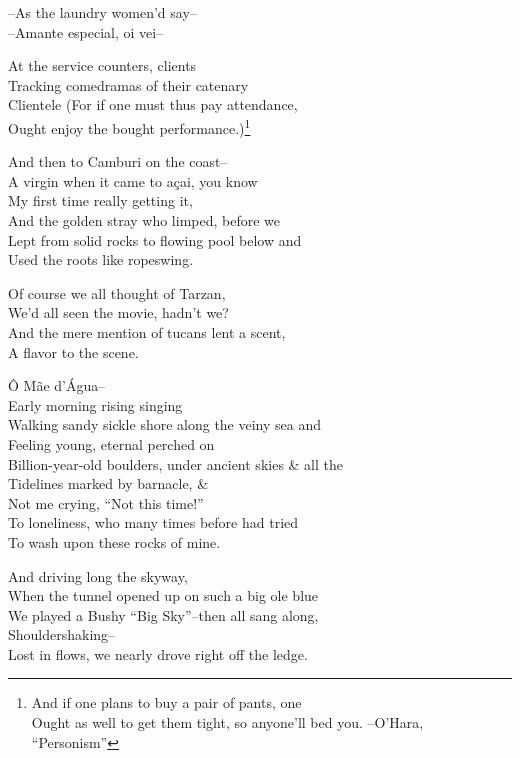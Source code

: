 --As the laundry women'd say-- \\
--Amante especial, oi vei-- 

At the service counters, clients \\
Tracking comedramas of their catenary \\
Clientele (For if one must thus pay attendance, \\ 
Ought enjoy the bought performance.)\footnote{And if one plans to buy a pair of pants, one \\
Ought as well to get them tight, so anyone'll bed you. --O'Hara, ``Personism''}

And then to Camburi on the coast-- \\
A virgin when it came to açai, you know \\
My first time really getting it, \\
And the golden stray who limped, before we \\
Lept from solid rocks to flowing pool below and \\
Used the roots like ropeswing.

Of course we all thought of Tarzan, \\
We'd all seen the movie, hadn't we? \\
And the mere mention of tucans lent a scent, \\
A flavor to the scene.

Ô Mãe d'Água-- \\
Early morning rising singing \\
Walking sandy sickle shore along the veiny sea and \\
Feeling young, eternal perched on \\ 
Billion-year-old boulders, under ancient skies \& all the \\
Tidelines marked by barnacle, \& \\
Not me crying, ``Not this time!'' \\
To loneliness, who many times before had tried \\
To wash upon these rocks of mine.

And driving long the skyway, \\
When the tunnel opened up on such a big ole blue \\
We played a Bushy “Big Sky”--then all sang along, \\
Shouldershaking-- \\
Lost in flows, we nearly drove right off the ledge. 